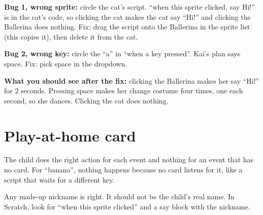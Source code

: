 \begin{answer}
\textbf{Bug 1, wrong sprite:} circle the cat's script. \enquote{when this sprite clicked, say Hi!} is in the cat's code, so clicking the cat makes the cat say \enquote{Hi!} and clicking the Ballerina does nothing. Fix: drag the script onto the Ballerina in the sprite list (this copies it), then delete it from the cat.

\textbf{Bug 2, wrong key:} circle the \enquote{a} in \enquote{when a key pressed}. Kai's plan says space. Fix: pick space in the dropdown.

\textbf{What you should see after the fix:} clicking the Ballerina makes her say \enquote{Hi!} for 2 seconds. Pressing space makes her change costume four times, one each second, so she dances. Clicking the cat does nothing.
\end{answer}

\section{Play-at-home card}
\begin{answer}
The child does the right action for each event and nothing for an event that has no card. For \enquote{banana}, nothing happens because no card listens for it, like a script that waits for a different key.
\end{answer}

\begin{answer}
Any made-up nickname is right. It should not be the child's real name. In Scratch, look for \enquote{when this sprite clicked} and a say block with the nickname.
\end{answer}
